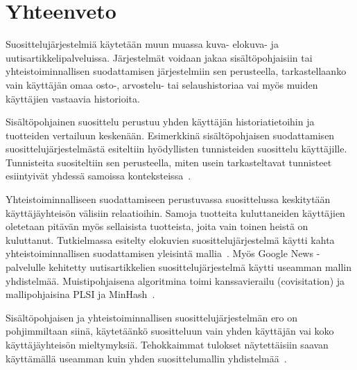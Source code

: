 \documentclass[12pt,finnish]{tktltiki2}
\theoremstyle{definition}
\theoremstyle{remark}
\begin{document}
        
\section{Yhteenveto}

Suosittelujärjestelmiä käytetään muun muassa kuva- elokuva- ja uutisartikkelipalveluissa. Järjestelmät voidaan jakaa sisältöpohjaisiin tai yhteistoiminnallisen suodattamisen järjestelmiin sen perusteella, tarkastellaanko vain käyttäjän omaa osto-, arvostelu- tai selaushistoriaa vai myös muiden käyttäjien vastaavia historioita.

Sisältöpohjainen suosittelu perustuu yhden käyttäjän historiatietoihin ja tuotteiden vertailuun keskenään. Esimerkkinä sisältöpohjaisen suodattamisen suosittelujärjestelmästä esiteltiin hyödyllisten tunnisteiden suosittelu käyttäjille. Tunnisteita suositeltiin sen perusteella, miten usein tarkasteltavat tunnisteet esiintyivät yhdessä samoissa konteksteissa~\cite{Sigurbjornsson:2008:FTR:1367497.1367542}.
 
Yhteistoiminnalliseen suodattamiseen perustuvassa suosittelussa keskitytään käyttäjäyhteisön välisiin relaatioihin. Samoja tuotteita kuluttaneiden käyttäjien oletetaan pitävän myös sellaisista tuotteista, joita vain toinen heistä on kuluttanut. Tutkielmassa esitelty elokuvien suosittelujärjestelmä käytti kahta yhteistoiminnallisen suodattamisen yleisintä mallia~\cite{Koren:2008:FMN:1401890.1401944}. Myös Google News -palvelulle kehitetty uutisartikkelien suosittelujärjestelmä käytti useamman mallin yhdistelmää. Muistipohjaisena algoritmina toimi kanssavierailu (covisitation) ja mallipohjaisina PLSI ja MinHash~\cite{Das:2007:GNP:1242572.1242610}.

Sisältöpohjaisen ja yhteistoiminnallisen suosittelujärjestelmän ero on pohjimmiltaan siinä, käytetäänkö suositteluun vain yhden käyttäjän vai koko käyttäjäyhteisön mieltymyksiä. Tehokkaimmat tulokset näytettäisiin saavan käyttämällä useamman kuin yhden suosittelumallin yhdistelmää~\cite{Bell:2007:LNP:1345448.1345465}\cite{Burke:2002:HRS:586321.586352}\cite{Koren:2008:FMN:1401890.1401944}.





%
%
% 
%







 
\end{document}
